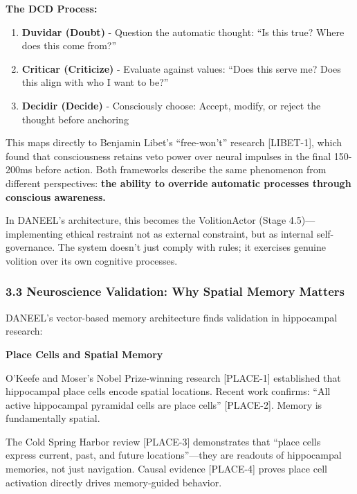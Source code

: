\documentclass[
  11pt,
]{article}
\providecommand{\tightlist}{%
  \setlength{\itemsep}{0pt}\setlength{\parskip}{0pt}}
\begin{document}
\textbf{The DCD Process:}

\begin{enumerate}
\def\labelenumi{\arabic{enumi}.}
\tightlist
\item
  \textbf{Duvidar (Doubt)} - Question the automatic thought: ``Is this
  true? Where does this come from?''
\item
  \textbf{Criticar (Criticize)} - Evaluate against values: ``Does this
  serve me? Does this align with who I want to be?''
\item
  \textbf{Decidir (Decide)} - Consciously choose: Accept, modify, or
  reject the thought before anchoring
\end{enumerate}

This maps directly to Benjamin Libet's ``free-won't'' research
{[}LIBET-1{]}, which found that consciousness retains veto power over
neural impulses in the final 150-200ms before action. Both frameworks
describe the same phenomenon from different perspectives: \textbf{the
ability to override automatic processes through conscious awareness.}

In DANEEL's architecture, this becomes the VolitionActor (Stage
4.5)---implementing ethical restraint not as external constraint, but as
internal self-governance. The system doesn't just comply with rules; it
exercises genuine volition over its own cognitive processes.

\subsubsection{3.3 Neuroscience Validation: Why Spatial Memory
Matters}\label{neuroscience-validation-why-spatial-memory-matters}

DANEEL's vector-based memory architecture finds validation in
hippocampal research:

\textbf{Place Cells and Spatial Memory}

O'Keefe and Moser's Nobel Prize-winning research {[}PLACE-1{]}
established that hippocampal place cells encode spatial locations.
Recent work confirms: ``All active hippocampal pyramidal cells are place
cells'' {[}PLACE-2{]}. Memory is fundamentally spatial.

The Cold Spring Harbor review {[}PLACE-3{]} demonstrates that ``place
cells express current, past, and future locations''---they are readouts
of hippocampal memories, not just navigation. Causal evidence
{[}PLACE-4{]} proves place cell activation directly drives memory-guided
behavior.
\end{document}
